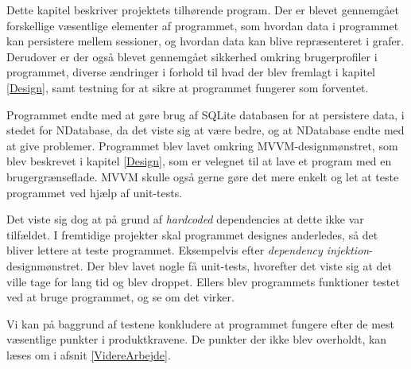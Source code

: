 Dette kapitel beskriver projektets tilhørende program. Der er blevet gennemgået forskellige væsentlige elementer af programmet, som hvordan data i programmet kan persistere mellem sessioner, og hvordan data kan blive repræsenteret i grafer. Derudover er der også blevet gennemgået sikkerhed omkring brugerprofiler i programmet, diverse ændringer i forhold til hvad der blev fremlagt i kapitel \ref{Design}, samt testning for at sikre at programmet fungerer som forventet.

Programmet endte med at gøre brug af SQLite databasen for at persistere data, i stedet for NDatabase, da det viste sig at være bedre, og at NDatabase endte med at give problemer. Programmet blev lavet omkring MVVM-designmønstret, som blev beskrevet i kapitel \ref{Design}, som er velegnet til at lave et program med en brugergrænseflade. MVVM skulle også gerne gøre det mere enkelt og let at teste programmet ved hjælp af unit-tests.

Det viste sig dog at på grund af \textit{hardcoded} dependencies at dette ikke var tilfældet. I fremtidige projekter skal programmet designes anderledes, så det bliver lettere at teste programmet. Eksempelvis efter \textit{dependency injektion}-designmønstret. Der blev lavet nogle få unit-tests, hvorefter det viste sig at det ville tage for lang tid og blev droppet. Ellers blev programmets funktioner testet ved at bruge programmet, og se om det virker. 

Vi kan  på baggrund af testene konkludere at programmet fungere efter de mest væsentlige punkter i produktkravene. De punkter der ikke blev overholdt, kan læses om i afsnit \ref{VidereArbejde}.


